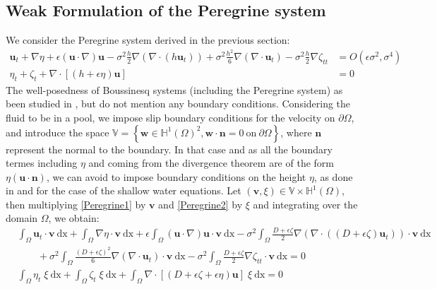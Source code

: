 \documentclass[11pt,a4paper]{article}
\begin{document}
\subsection{Weak Formulation of the Peregrine system}
	We consider the Peregrine system derived in the previous section: 
	\begin{align}
		\mathbf{u}_t + \nabla \eta + \epsilon (\mathbf{u} \cdot \nabla)\mathbf{u} - \sigma^2\frac{h}{2}\nabla (\nabla \cdot (h \mathbf{u}_t)) + \sigma^2 \frac{h^2}{6}\nabla (\nabla \cdot \mathbf{u}_t) - \sigma^2\frac{h}{2}\nabla \zeta_{tt}  &= O(\epsilon \sigma^2, \sigma^4) \label{Peregrine1}\\
		\eta_t+\zeta_t + \nabla \cdot [(h+\epsilon\eta)\mathbf{u}] &= 0 \label{Peregrine2}
	\end{align}	
	The well-posedness of Boussinesq systems (including the Peregrine system) as been studied in \cite{QuinteroMunoz}, but do not mention any boundary conditions. 	Considering the fluid to be in a pool, we impose slip boundary conditions for the velocity on $\partial \Omega$, and introduce the space $\mathbb{V} = \left\lbrace \mathbf{w} \in \mathbb{H}^1(\Omega)^2, \mathbf{w} \cdot \mathbf{n} = 0 \: \mathrm{on} \: \partial \Omega \right\rbrace $, where $\mathbf{n}$ represent the normal to the boundary. In that case and as all the boundary termes including $\eta$ and coming from the divergence theorem are of the form $\eta (\mathbf{u} \cdot \mathbf{n})$, we can avoid to impose boundary conditions on the height $\eta$, as done in \cite{HanertLegatDeleersnijder} and \cite{DawsonMartinez} for the case of the shallow water equations. Let $(\mathbf{v},\xi) \in \mathbb{V} \times \mathbb{H}^1(\Omega)$, then multiplying \eqref{Peregrine1} by $\mathbf{v}$ and \eqref{Peregrine2} by $\xi$ and integrating over the domain $\Omega$, we obtain:   
	\begin{equation}
		\begin{split}
			&\int_{\Omega} \! \mathbf{u}_t \cdot \mathbf{v} \: \mathrm{dx} + \int_{\Omega} \! \nabla \eta \cdot \mathbf{v} \: \mathrm{dx} + \epsilon \! \int_{\Omega} \! (\mathbf{u} \cdot \nabla ) \mathbf{u} \cdot \mathbf{v} \: \mathrm{dx} - \sigma^2 \! \int_{\Omega} \! \frac{D + \epsilon \zeta}{2} \nabla (\nabla \cdot ((D + \epsilon \zeta) \mathbf{u}_t)) \cdot \mathbf{v} \: \mathrm{dx} \\
			&\qquad + \sigma^2 \! \int_{\Omega} \! \frac{(D + \epsilon \zeta)^2}{6} \nabla (\nabla \cdot \mathbf{u}_t) \cdot \mathbf{v} \: \mathrm{dx} - \sigma^2 \! \int_{\Omega} \! \frac{D + \epsilon \zeta}{2} \nabla \zeta_{tt} \cdot \mathbf{v} \: \mathrm{dx} = 0\\
			&\int_{\Omega}\! \eta_t \; \xi \: \mathrm{dx} +\int_{\Omega}\! \zeta_t \; \xi \: \mathrm{dx} +\int_{\Omega}\! \nabla \cdot [(D + \epsilon \zeta+\epsilon\eta) \mathbf{u}] \; \xi \: \mathrm{dx} = 0
		\end{split}
		\label{PeregrineWeakForm1}
	\end{equation}
\end{document}
